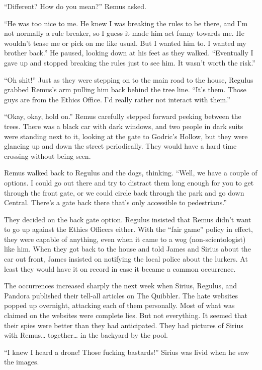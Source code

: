 \documentclass[12pt,twoside,openright]{memoir}
\begin{document}
``Different? How do you mean?'' Remus asked.

``He was too nice to me. He knew I was breaking the rules to be there, and I'm not normally a rule breaker, so I guess it made him act funny towards me. He wouldn't tease me or pick on me like usual. But I wanted him to. I wanted my brother back.'' He paused, looking down at his feet as they walked. ``Eventually I gave up and stopped breaking the rules just to see him. It wasn't worth the risk.''

``Oh shit!'' Just as they were stepping on to the main road to the house, Regulus grabbed Remus's arm pulling him back behind the tree line. ``It's them. Those guys are from the Ethics Office. I'd really rather not interact with them.''

``Okay, okay, hold on.'' Remus carefully stepped forward peeking between the trees. There was a black car with dark windows, and two people in dark suits were standing next to it, looking at the gate to Godric's Hollow, but they were glancing up and down the street periodically. They would have a hard time crossing without being seen.

Remus walked back to Regulus and the dogs, thinking. ``Well, we have a couple of options. I could go out there and try to distract them long enough for you to get through the front gate, or we could circle back through the park and go down Central. There's a gate back there that's only accessible to pedestrians.'' 

They decided on the back gate option. Regulus insisted that Remus didn't want to go up against the Ethics Officers either. With the ``fair game'' policy in effect, they were capable of anything, even when it came to a wog
(non-scientologist) like him. When they got back to the house and told James and Sirius about the car out front, James insisted on notifying the local police about the lurkers. At least they would have it on record in case it became a common occurrence.

The occurrences increased sharply the next week when Sirius, Regulus, and Pandora published their tell-all articles on The Quibbler. The hate websites popped up overnight, attacking each of them personally. Most of what was claimed on the websites were complete lies. But not everything. It seemed that their spies were better than they had anticipated. They had pictures of Sirius with Remus… together… in the backyard by the pool. 

``I knew I heard a drone! Those fucking bastards!'' Sirius was livid when he saw the images. 
\end{document}

